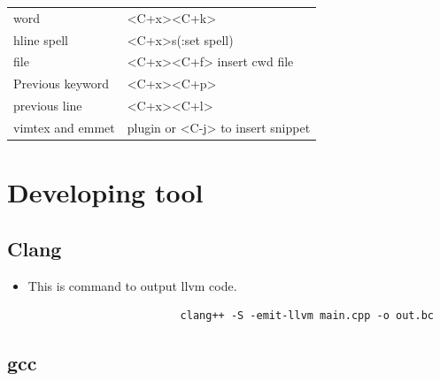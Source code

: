 \documentclass[a4paper,11pt,twoside]{book}
\begin{document}
\begin{itemize}
\begin{tabular}{p{}|p{}}
\hline 
word & <C+x><C+k>\\ 

hline
spell & <C+x>s(:set spell)\\ 

\hline 
file & <C+x><C+f> insert cwd file  \\ 

\hline
Previous keyword & <C+x><C+p> \\

\hline
previous line & <C+x><C+l> \\

\hline 
vimtex and emmet & plugin or <C-j> to insert snippet\\

\hline
\end{tabular}

\end{itemize}



\chapter{Developing tool}

\section{Clang}

\begin{itemize}
		\item This is command to output llvm code.
				\begin{lstlisting}
						clang++ -S -emit-llvm main.cpp -o out.bc
				\end{lstlisting}
\end{itemize}

\section{gcc}
\end{document}

